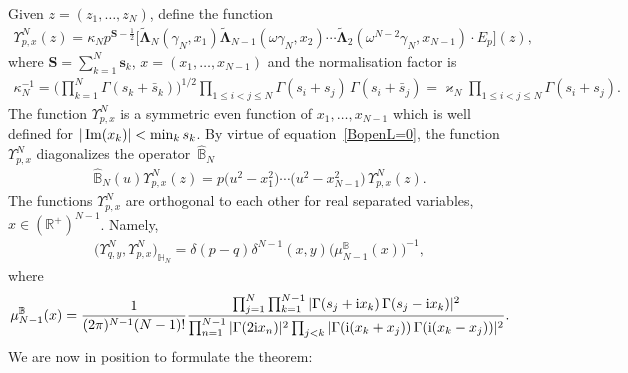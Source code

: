 Given $ z=(z_1,\dots, z_{N})$, define the function
\begin{gather*}%
\Upsilon^N_{p,{x}}( z) = \kappa_N p^{\boldsymbol S-\frac12}
 \Big[ \widetilde{\boldsymbol\Lambda}_N(\gamma_N, x_1)
 \widetilde{\boldsymbol\Lambda}_{N-1}(\omega\gamma_N, x_2)\cdots \widetilde{\boldsymbol\Lambda}_2(\omega^{N-2}\gamma_N, x_{N-1})
 \cdot E_p \Big]( z),
\end{gather*}
where $\boldsymbol S=\sum_{k=1}^N \boldsymbol s_k$, $x=(x_1,\dots,x_{N-1})$ and the normalisation factor is
\begin{gather*}
\kappa_N^{-1}=\bigg(\prod_{k=1}^N\Gamma(s_k+\bar s_k)\bigg)^{1/2} \prod_{1\leq i<j\leq N}\Gamma(s_i+s_j)\,\Gamma(s_i+\bar s_j)=
\varkappa_N \prod_{1\leq i<j\leq N}\Gamma(s_i+s_j).
\end{gather*}
The function $\Upsilon^N_{p, x}$ is a symmetric even function of $x_1,\dots,x_{N-1}$
which is well defined for $|\mathop{\rm Im}(x_k)|\allowbreak <\min_k s_k$.
By virtue of equation~\eqref{BopenL=0}, the function $\Upsilon^N_{p,{x}}$ diagonalizes the operator~$\widehat{\mathbb B}_N$
\begin{gather*}
\widehat{\mathbb B}_N(u)\Upsilon^N_{p,{x}}( z) = p
\big(u^2-x_1^2\big)\cdots \big(u^2-x_{N-1}^2\big)\,\Upsilon^N_{p,{x}}( z).
\end{gather*}
The functions $\Upsilon^N_{p, x}$ are orthogonal to each other for real separated variables, $ x \in (\mathbb{R}^+)^{N-1}$. Namely,
\begin{gather*}
\big(\Upsilon^N_{q,{y}},\Upsilon^N_{p,{x}}\big)_{\mathbb H_N} =
 \delta(p-q)\delta^{N-1}( x,y) \big(\mu_{N-1}^{\mathbb B}( x)\big)^{-1},
\end{gather*}
where
\begin{gather*}%
\mu_{N-1}^{\mathbb B}(x)=\frac1{(2\pi)^{N-1}(N-1)!}
\frac {\prod_{j=1}^N\prod_{k=1}^{N-1}|\Gamma(s_j +{\rm i}x_k)\,\Gamma(s_j -{\rm i}x_k)|^{2}}
{\prod_{n=1}^{N-1}|\Gamma(2{\rm i}x_n)|^2\prod_{j< k}
|\Gamma({\rm i}(x_k + x_j))\,\Gamma({\rm i}(x_k - x_j))|^2 }.
\end{gather*}
We are now in position to formulate the theorem:
